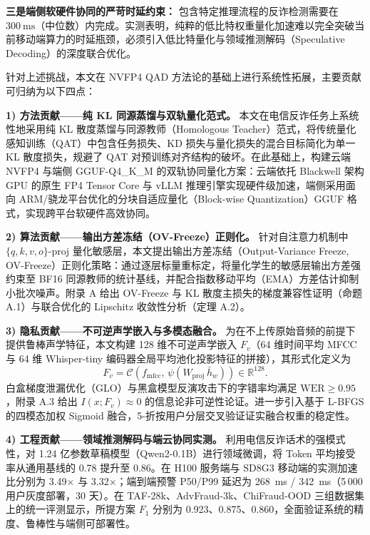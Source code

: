 \documentclass[11pt, a4paper]{article}
\begin{document}
\textbf{三是端侧软硬件协同的严苛时延约束：} 包含特定推理流程的反诈检测需要在 $300~\text{ms}$（中位数）内完成。实测表明，纯粹的低比特权重量化加速难以完全突破当前移动端算力的时延瓶颈，必须引入低比特量化与领域推测解码（Speculative Decoding）的深度联合优化。

针对上述挑战，本文在 NVFP4 QAD 方法论的基础上进行系统性拓展，主要贡献可归纳为以下四点：

    \textbf{1) 方法贡献——纯 KL 同源蒸馏与双轨量化范式。} 本文在电信反诈任务上系统性地采用纯 KL 散度蒸馏与同源教师（Homologous Teacher）范式，将传统量化感知训练（QAT）中包含任务损失、KD 损失与量化损失的混合目标简化为单一 KL 散度损失，规避了 QAT 对预训练对齐结构的破坏。在此基础上，构建云端 NVFP4 与端侧 GGUF-Q4\_K\_M 的双轨协同量化方案：云端依托 Blackwell 架构 GPU 的原生 FP4 Tensor Core 与 vLLM 推理引擎实现硬件级加速，端侧采用面向 ARM/骁龙平台优化的分块自适应量化（Block-wise Quantization）GGUF 格式，实现跨平台软硬件高效协同。

    \textbf{2) 算法贡献——输出方差冻结（OV-Freeze）正则化。} 针对自注意力机制中 $\{q,k,v,o\}\text{-proj}$ 量化敏感层，本文提出输出方差冻结（Output-Variance Freeze, OV-Freeze）正则化策略：通过逐层标量重标定，将量化学生的敏感层输出方差强约束至 BF16 同源教师的统计基线，并配合指数移动平均（EMA）方差估计抑制小批次噪声。附录 A 给出 OV-Freeze 与 KL 散度主损失的梯度兼容性证明（命题 A.1）与联合优化的 Lipschitz 收敛性分析（定理 A.2）。

    \textbf{3) 隐私贡献——不可逆声学嵌入与多模态融合。} 为在不上传原始音频的前提下提供鲁棒声学特征，本文构建 128 维不可逆声学嵌入 $F_v$（64 维时间平均 MFCC 与 64 维 Whisper-tiny 编码器全局平均池化投影特征的拼接），其形式化定义为
    \begin{equation}
        F_v = \mathcal{C}\!\left( f_{\text{mfcc}},\, \psi(W_{\text{proj}}\,\bar{h}_w) \right) \in \mathbb{R}^{128}.
    \end{equation}
    白盒梯度泄漏优化（GLO）与黑盒模型反演攻击下的字错率均满足 $\text{WER} \ge 0.95$，附录 A.3 给出 $I(x; F_v) \approx 0$ 的信息论非可逆性论证。进一步引入基于 L-BFGS 的四模态加权 Sigmoid 融合，5-折按用户分层交叉验证证实融合权重的稳定性。

    \textbf{4) 工程贡献——领域推测解码与端云协同实测。} 利用电信反诈话术的强模式性，对 1.24 亿参数草稿模型（Qwen2-0.1B）进行领域微调，将 Token 平均接受率从通用基线的 0.78 提升至 0.86。在 H100 服务端与 SD8G3 移动端的实测加速比分别为 3.49$\times$ 与 3.32$\times$；端到端预警 P50/P99 延迟为 268~ms / 342~ms（5\,000 用户灰度部署，30 天）。在 TAF-28k、AdvFraud-3k、ChiFraud-OOD 三组数据集上的统一评测显示，所提方案 $F_1$ 分别为 0.923、0.875、0.860，全面验证系统的精度、鲁棒性与端侧可部署性。
\end{document}

